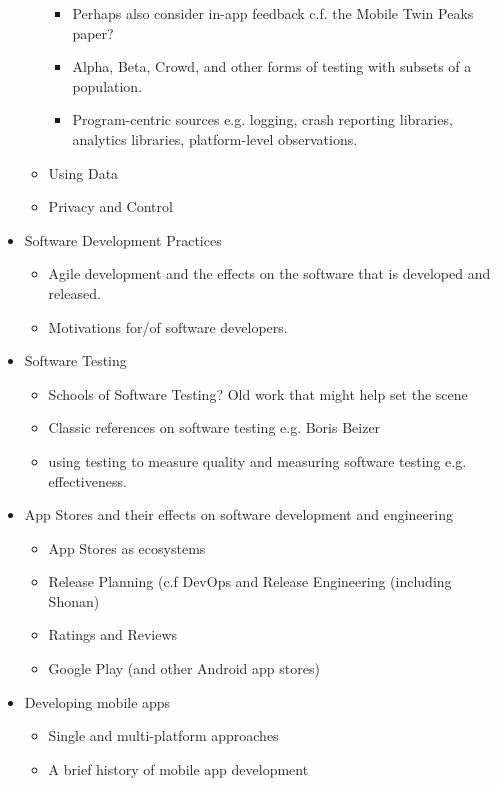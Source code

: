 \begin{itemize}
\begin{itemize}
\begin{itemize}
            \item Perhaps also consider in-app feedback c.f. the Mobile Twin Peaks paper?
            \item Alpha, Beta, Crowd, and other forms of testing with subsets of a population.
            \item Program-centric sources e.g. logging, crash reporting libraries, analytics libraries, platform-level observations.
        \end{itemize}
        \item Using Data
        \item Privacy and Control
    \end{itemize}
    \item Software Development Practices
    \begin{itemize}
        \item Agile development and the effects on the software that is developed and released.
        \item Motivations for/of software developers.
    \end{itemize}
    \item Software Testing
    \begin{itemize}
        \item Schools of Software Testing? Old work that might help set the scene
        \item Classic references on software testing e.g. Boris Beizer
        \item using testing to measure quality and measuring software testing e.g. effectiveness.
    \end{itemize}
    \item App Stores and their effects on software development and engineering
    \begin{itemize}
        \item App Stores as ecosystems
        \item Release Planning (c.f DevOps and Release Engineering (including Shonan)
        \item Ratings and Reviews
        \item Google Play (and other Android app stores)
    \end{itemize}
    \item Developing mobile apps
    \begin{itemize}
        \item Single and multi-platform approaches
        \item A brief history of mobile app development

\end{itemize}
\end{itemize}
